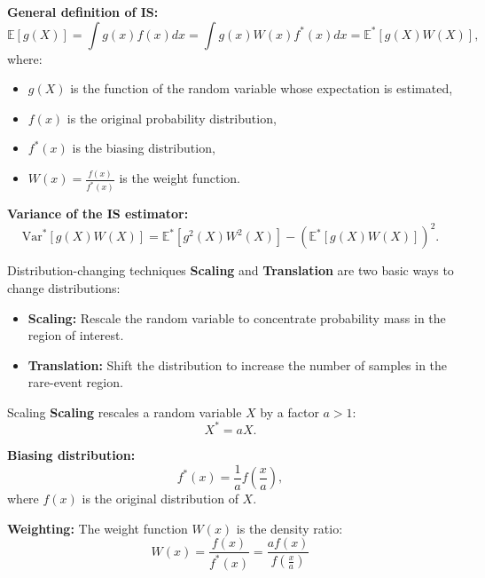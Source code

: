 \documentclass{beamer}
\begin{document}
\begin{frame}
    \textbf{General definition of IS:}
    \[
    \mathbb{E}[g(X)] = \int g(x)f(x)dx = \int g(x)W(x)f^*(x)dx = \mathbb{E}^*[g(X)W(X)],
    \]
    where:
    \begin{itemize}
        \item $g(X)$ is the function of the random variable whose expectation is estimated,
        \item $f(x)$ is the original probability distribution,
        \item $f^*(x)$ is the biasing distribution,
        \item $W(x) = \frac{f(x)}{f^*(x)}$ is the weight function.
    \end{itemize}

    \vspace{0.5cm}
    \textbf{Variance of the IS estimator:}
    \[
    \text{Var}^*[g(X)W(X)] = \mathbb{E}^*[g^2(X)W^2(X)] - \left(\mathbb{E}^*[g(X)W(X)]\right)^2.
    \]
\end{frame}






\begin{frame}{Distribution-changing techniques}
    \vspace{0.5cm}
    \textbf{Scaling} and \textbf{Translation} are two basic ways to change distributions:
    \begin{itemize}
        \item \textbf{Scaling:} Rescale the random variable to concentrate probability mass in the region of interest.
        \item \textbf{Translation:} Shift the distribution to increase the number of samples in the rare-event region.
    \end{itemize}
\end{frame}

\begin{frame}{Scaling}
    \textbf{Scaling} rescales a random variable $X$ by a factor $a > 1$:
    \[
    X^* = aX.
    \]

    \textbf{Biasing distribution:}
    \[
    f^*(x) = \frac{1}{a}f\left(\frac{x}{a}\right),
    \]
    where $f(x)$ is the original distribution of $X$.

    \vspace{0.5cm}
    \textbf{Weighting:} The weight function $W(x)$ is the density ratio:
    \[
    W(x) = \frac{f(x)}{f^*(x)} = \frac{af(x)}{f(\frac{x}{a})}
    \]
\end{frame}
\end{document}
